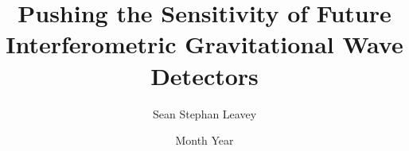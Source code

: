 
\usepackage{graphicx}
\usepackage{url}
\usepackage[font=scriptsize]{subfig}
\usepackage{amsmath}
\usepackage{amssymb}
\usepackage{bookmark}
\usepackage{color}
\usepackage{changebar}
\usepackage{soul}
\usepackage{hyphenat} %


\usepackage[minnames=1,maxnames=5,style=numeric-comp,sorting=none,backend=bibtex]{biblatex}




\usepackage[separate-uncertainty=true]{siunitx}



\newcommand{\note}[1]{\textcolor{red}{\emph{[\textbf{Note: }#1]}}}

\usepackage{xcolor}   %
\usepackage{ifthen}   %
\usepackage{chapterthumb}
\usepackage{scrpage2}

\newcommand{\chapterthumbson}{\ifpdfoutput{\ihead[\putchapterthumb]{\putchapterthumb}}{}}
\newcommand{\chapterthumbsoff}{\ifpdfoutput{\ihead[]{}}{}}

\pagestyle{scrheadings}





\title{Pushing the Sensitivity of Future Interferometric Gravitational Wave Detectors}
\author{Sean Stephan Leavey}
\date{Month Year}

\maketitle

